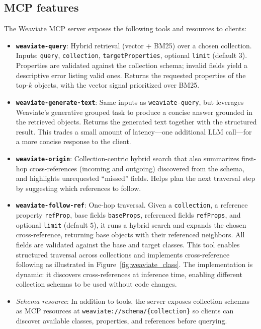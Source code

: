\subsection{MCP features}
The Weaviate MCP server exposes the following tools and resources to clients:
\begin{itemize}
    \item \textbf{\texttt{weaviate-query}}: Hybrid retrieval (vector + BM25) over a chosen collection. Inputs: \texttt{query}, \texttt{collection}, \texttt{targetProperties}, optional \texttt{limit} (default 3). Properties are validated against the collection schema; invalid fields yield a descriptive error listing valid ones. Returns the requested properties of the top-$k$ objects, with the vector signal prioritized over BM25.
    \item \textbf{\texttt{weaviate-generate-text}}: Same inputs as \texttt{weaviate-query}, but leverages Weaviate's generative grouped task to produce a concise answer grounded in the retrieved objects. Returns the generated text together with the structured result. This trades a small amount of latency---one additional LLM call---for a more concise response to the client.
    \item \textbf{\texttt{weaviate-origin}}: Collection-centric hybrid search that also summarizes first-hop cross-references (incoming and outgoing) discovered from the schema, and highlights unrequested ``missed'' fields. Helps plan the next traversal step by suggesting which references to follow.
    \item \textbf{\texttt{weaviate-follow-ref}}: One-hop traversal. Given a \texttt{collection}, a reference property \texttt{refProp}, base fields \texttt{baseProps}, referenced fields \texttt{refProps}, and optional \texttt{limit} (default 5), it runs a hybrid search and expands the chosen cross-reference, returning base objects with their referenced neighbors. All fields are validated against the base and target classes. This tool enables structured traversal across collections and implements cross-reference following as illustrated in Figure~\ref{fig:weaviate_class}. The implementation is dynamic: it discovers cross-references at inference time, enabling different collection schemas to be used without code changes.
    \item \emph{Schema resource}: In addition to tools, the server exposes collection schemas as MCP resources at \texttt{weaviate://schema/\{collection\}} so clients can discover available classes, properties, and references before querying.
\end{itemize}


